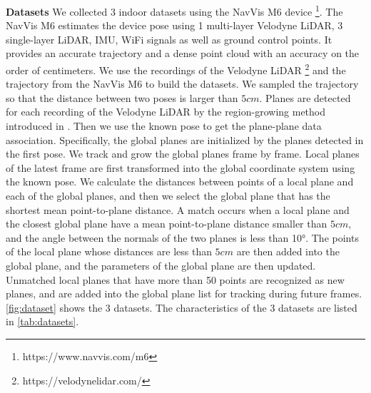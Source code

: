 \documentclass{vgtc}                          %
\begin{document}
\textbf{Datasets} \quad We collected 3 indoor datasets using the NavVis M6 device \footnote{https://www.navvis.com/m6}. The NavVis M6 estimates the device pose using  1 multi-layer  Velodyne LiDAR, 3 single-layer LiDAR,  IMU, WiFi signals as well as ground control points. It provides an accurate trajectory and a dense point cloud with  an accuracy on the order of centimeters. We use the recordings of the Velodyne LiDAR \footnote{https://velodynelidar.com/} and the trajectory from the NavVis M6 to build the datasets. We sampled the trajectory so that  the distance between two poses is larger than $5cm$.
Planes are detected for each recording of the Velodyne LiDAR by the region-growing method introduced in \cite{poppinga2008fast}. Then we use the known pose to get the plane-plane data association. Specifically,  the global planes are initialized by the planes detected in the first pose. We track and grow the global planes frame by frame. Local planes of  the latest frame are first transformed into the global coordinate system using the known pose.  We calculate the  distances between   points of a local plane  and each of the global planes, and then we  select the global plane that has the shortest mean point-to-plane distance.  A match occurs when  a local plane and the closest global plane have a mean point-to-plane distance   smaller than $5cm$, and the angle between the normals of the two planes is less than 10\si{\degree}. The points  of  the local plane whose distances are less than $5cm$ are then  added into the global plane, and the parameters of the global plane are then updated. Unmatched local planes that have more than 50 points are recognized as new planes, and are  added into the global plane list for  tracking during future frames.  \autoref{fig:dataset} shows the 3 datasets. The characteristics of the 3 datasets are listed in \autoref{tab:datasets}.
\end{document}
